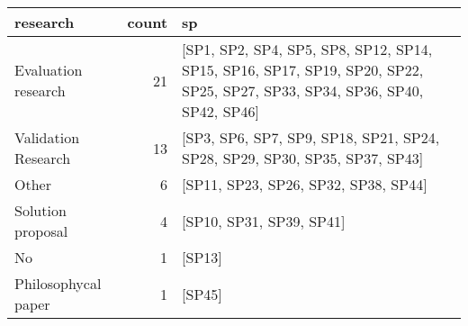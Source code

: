 \begin{tabular}{lrl}
\toprule
            research &  count &                                                                                                                         sp \\
\midrule
 Evaluation research &     21 &  [SP1, SP2, SP4, SP5, SP8, SP12, SP14, SP15, SP16, SP17, SP19, SP20, SP22, SP25, SP27, SP33, SP34, SP36, SP40, SP42, SP46] \\
 Validation Research &     13 &                                                 [SP3, SP6, SP7, SP9, SP18, SP21, SP24, SP28, SP29, SP30, SP35, SP37, SP43] \\
               Other &      6 &                                                                                       [SP11, SP23, SP26, SP32, SP38, SP44] \\
   Solution proposal &      4 &                                                                                                   [SP10, SP31, SP39, SP41] \\
                  No &      1 &                                                                                                                     [SP13] \\
 Philosophycal paper &      1 &                                                                                                                     [SP45] \\
\bottomrule
\end{tabular}
